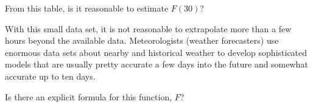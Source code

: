 \documentclass[nooutcomes]{ximera}
\begin{document}
\begin{problem}
\begin{problem}
From this table, is it reasonable to estimate $F(30)$? 
\begin{multipleChoice}
\end{multipleChoice}
\begin{feedback}[correct]
With this small data set, it is not reasonable to extrapolate more than a few hours beyond the available data.  Meteorologists (weather forecasters) use enormous data sets about nearby and historical weather to develop sophisticated models that are usually pretty accurate a few days into the future and somewhat accurate up to ten days.
\end{feedback}

\begin{problem}
Is there an explicit formula for this function, $F$?  
\begin{multipleChoice}
\end{multipleChoice}
\end{problem}

\end{problem}
\end{problem}



%
%
\end{document}
